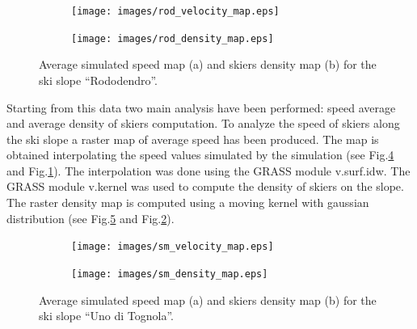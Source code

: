 \documentclass[12pt,a4paper,twoside]{book}
\begin{document}
\begin{figure}
        \centering
        \begin{subfigure}[b]{\textwidth}
                \centering
                \texttt{[image: images/rod\_velocity\_map.eps]}
                \caption{}\label{rododendro_vel}
        \end{subfigure}%

        \begin{subfigure}[b]{\textwidth}
                \centering
                \texttt{[image: images/rod\_density\_map.eps]}
                \caption{}\label{rododendro_den}
        \end{subfigure}
        \caption{Average simulated speed map (a) and skiers density map (b) for the ski slope ``Rododendro''.}\label{rododendro}
\end{figure}

Starting from this data two main analysis have been performed: speed average and average density of skiers computation. To analyze the speed of skiers along the ski slope a raster map of average speed has been produced. The map is obtained interpolating the speed values simulated by the simulation (see Fig.\ref{uno_tognola_vel} and Fig.\ref{rododendro_vel}). The interpolation was done using the GRASS module v.surf.idw. The GRASS module v.kernel was used to compute the density of skiers on the slope. The raster density map is computed using a moving kernel with gaussian distribution (see Fig.\ref{uno_tognola_den} and Fig.\ref{rododendro_den}).

\begin{figure}
        \centering
        \begin{subfigure}[b]{\textwidth}
                \centering
                \texttt{[image: images/sm\_velocity\_map.eps]}
                \caption{}\label{uno_tognola_vel}
        \end{subfigure}%

        \begin{subfigure}[b]{\textwidth}
                \centering
                \texttt{[image: images/sm\_density\_map.eps]}
                \caption{}\label{uno_tognola_den}
        \end{subfigure}
        \caption{Average simulated speed map (a) and skiers density map (b) for the ski slope ``Uno di Tognola''.}\label{uno_tognola}
\end{figure}
\end{document}
